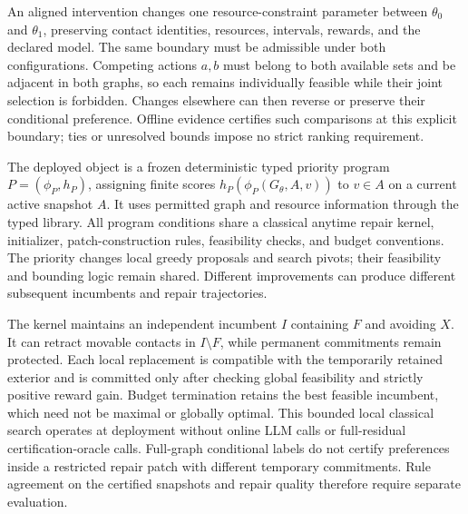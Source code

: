 An aligned intervention changes one resource-constraint parameter between
$\theta_0$ and $\theta_1$, preserving contact identities, resources,
intervals, rewards, and the declared model. The same boundary must be
admissible under both configurations. Competing actions $a,b$ must belong
to both available sets and be adjacent in both graphs, so each remains
individually feasible while their joint selection is forbidden. Changes
elsewhere can then reverse or preserve their conditional preference.
Offline evidence certifies such comparisons at this explicit boundary;
ties or unresolved bounds impose no strict ranking requirement.

The deployed object is a frozen deterministic typed priority program
$P=(\phi_P,h_P)$, assigning finite scores
$h_P(\phi_P(G_\theta,A,v))$ to $v\in A$ on a current active snapshot $A$.
It uses permitted graph and resource information through the typed library.
All program conditions share a classical anytime repair kernel, initializer,
patch-construction rules, feasibility checks, and budget conventions.
The priority changes local greedy proposals and search pivots; their
feasibility and bounding logic remain shared. Different improvements can
produce different subsequent incumbents and repair trajectories.

The kernel maintains an independent incumbent $I$ containing $F$ and
avoiding $X$. It can retract movable contacts in $I\setminus F$, while
permanent commitments remain protected. Each local replacement is compatible
with the temporarily retained exterior and is committed only after checking
global feasibility and strictly positive reward gain. Budget termination
retains the best feasible incumbent, which need not be maximal or globally
optimal. This bounded local classical search operates at deployment without
online LLM calls or full-residual certification-oracle calls.
Full-graph conditional labels do not certify preferences inside a restricted
repair patch with different temporary commitments. Rule agreement on the
certified snapshots and repair quality therefore require separate evaluation.

